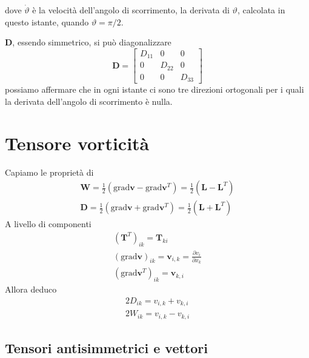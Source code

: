\documentclass[10pt,a4paper,twoside]{book}
\begin{document}

dove $\dot{\vartheta }$ è la velocità dell'angolo di scorrimento, la derivata di $\vartheta $, calcolata in questo istante, quando $\vartheta =\pi /2$.

$\mathbf{D}$, essendo simmetrico, si può diagonalizzare
\begin{equation*}
\mathbf{D} =\begin{bmatrix}
D_{11} & 0 & 0\\
0 & D_{22} & 0\\
0 & 0 & D_{33}
\end{bmatrix}
\end{equation*}
possiamo affermare che in ogni istante ci sono tre direzioni ortogonali per i quali la derivata dell'angolo di scorrimento è nulla.
\section{Tensore vorticità}

Capiamo le proprietà di
\begin{gather*}
\mathbf{W} =\frac{1}{2}\left(\mathrm{grad}\mathbf{v} -\mathrm{grad}\mathbf{v}^{T}\right) =\frac{1}{2}\left(\mathbf{L} -\mathbf{L}^{T}\right)\\
\mathbf{D} =\frac{1}{2}\left(\mathrm{grad}\mathbf{v} +\mathrm{grad}\mathbf{v}^{T}\right) =\frac{1}{2}\left(\mathbf{L} +\mathbf{L}^{T}\right)
\end{gather*}
A livello di componenti
\begin{gather*}
\left(\mathbf{T}^{T}\right)_{ik} =\mathbf{T}_{ki}\\
(\mathrm{grad}\mathbf{v})_{ik} =\mathbf{v}_{i,k} =\frac{\partial v_{i}}{\partial x_{k}}\\
\left(\mathrm{grad}\mathbf{v}^{T}\right)_{ik} =\mathbf{v}_{k,i}
\end{gather*}
Allora deduco
\begin{gather*}
2D_{ik} =v_{i,k} +v_{k,i}\\
2W_{ik} =v_{i,k} -v_{k,i}
\end{gather*}
\subsection{Tensori antisimmetrici e vettori}
\end{document}
